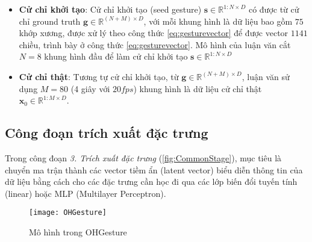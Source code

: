 \begin{itemize}
		\item \textbf{Cử chỉ khởi tạo}: Cử chỉ khởi tạo (seed gesture) $\mathbf{s} \in \mathbb{R}^{1:N \times D}$ có được từ cử chỉ ground truth $
		\mathbf{g} \in \mathbb{R}^{(N+M) \times D}$, với mỗi khung hình là dữ liệu bao gồm $75$ khớp xương, được xử lý theo công thức \autoref{eq:gesturevector} để được vector $1141$ chiều, trình bày ở công thức \autoref{eq:gesturevector}. Mô hình của luận văn cắt $N = 8$ khung hình đầu để làm cử chỉ khởi tạo $\mathbf{s} \in \mathbb{R}^{1:N \times D} $
		
		\item \textbf{Cử chỉ thật}: Tương tự cử chỉ khởi tạo, từ $
		\mathbf{g} \in \mathbb{R}^{(N+M) \times D}$, luận văn sử dụng $M = 80$ (4 giây với $20fps$) khung hình là dữ liệu cử chỉ thật $\mathbf{x}_{0} \in \mathbb{R}^{1:M \times D}$. 
\end{itemize}

\subsection{Công đoạn trích xuất đặc trưng}
\label{subsec:feature_extraction}

Trong công đoạn \textit{3. Trích xuất đặc trưng} (\autoref{fig:CommonStage}), mục tiêu là chuyển ma trận thành các vector tiềm ẩn (latent vector) biểu diễn thông tin của dữ liệu bằng cách cho các đặc trưng cần học đi qua các lớp biến đổi tuyến tính (linear) hoặc MLP (Multilayer Perceptron).

\begin{figure}[H]
	\centering
	\texttt{[image: OHGesture]}
	\caption{Mô hình trong OHGesture}
	\label{fig:OHGesture}
\end{figure}
\vspace{-10pt}

